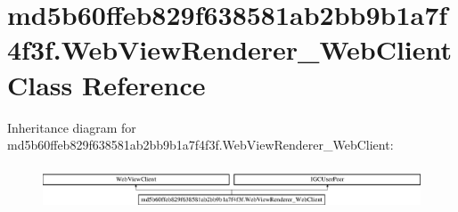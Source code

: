 \hypertarget{classmd5b60ffeb829f638581ab2bb9b1a7f4f3f_1_1WebViewRenderer__WebClient}{}\section{md5b60ffeb829f638581ab2bb9b1a7f4f3f.\+Web\+View\+Renderer\+\_\+\+Web\+Client Class Reference}
\label{classmd5b60ffeb829f638581ab2bb9b1a7f4f3f_1_1WebViewRenderer__WebClient}
Inheritance diagram for md5b60ffeb829f638581ab2bb9b1a7f4f3f.\+Web\+View\+Renderer\+\_\+\+Web\+Client\+:\begin{figure}[H]
\begin{center}
\leavevmode
\includegraphics[height=1.323877cm]{classmd5b60ffeb829f638581ab2bb9b1a7f4f3f_1_1WebViewRenderer__WebClient}
\end{center}
\end{figure}
